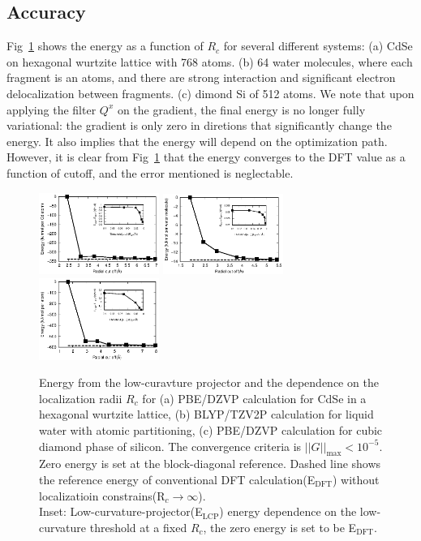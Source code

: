\documentclass[aps,prl,twocolumn,reprint,amsmath,amssymb]{revtex4-1}
\begin{document}
\subsection{Accuracy} 

Fig~\ref{fig:accuracy} shows the energy as a function of $R_c$ for several different systems: (a) CdSe on hexagonal wurtzite lattice with 768 atoms. (b) 64 water molecules, where each fragment is an atoms, and there are strong interaction and significant electron delocalization between fragments. (c) dimond Si of 512 atoms. We note that upon applying the filter $Q^x$ on the gradient, the final energy is no longer fully variational: the gradient is only zero in diretions that significantly change the energy. It also implies that the energy will depend on the optimization path. However, it is clear from Fig~\ref{fig:accuracy} that the energy converges to the DFT value as a function of cutoff, and the error mentioned is neglectable. 

\begin{figure}
\centering
\includegraphics[width=0.35\textwidth]{CdSe_conv}
\includegraphics[width=0.35\textwidth]{H2O_conv}
\includegraphics[width=0.35\textwidth]{Si_conv}
\caption{Energy from the low-curavture projector and the dependence on the localization radii $R_c$ for (a) PBE/DZVP calculation for CdSe in a hexagonal wurtzite lattice, (b) BLYP/TZV2P calculation for liquid water with atomic partitioning, (c) PBE/DZVP calculation for cubic diamond phase of silicon. The convergence criteria is $\vert\vert G\vert\vert_{\text{max}} < 10^{-5}$. Zero energy is set at the block-diagonal reference. Dashed line shows the reference energy of conventional DFT calculation(E$_{\text{DFT}}$) without localizatioin constrains(R$_c\rightarrow \infty$). \\
Inset: Low-curvature-projector(E$_{\text{LCP}}$) energy dependence on the low-curvature threshold at a fixed $R_c$, the zero energy is set to be E$_{\text{DFT}}$. }
\label{fig:accuracy}
\end{figure}
\end{document}
